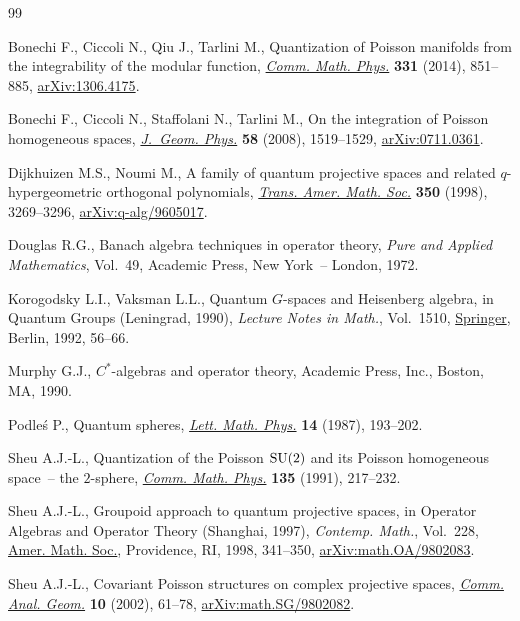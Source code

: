 \documentclass[pdftex]{sigma}
\begin{document}
\begin{thebibliography}{99}
\footnotesize\itemsep=0pt

Bonechi F., Ciccoli N., Qiu J., Tarlini M., Quantization of {P}oisson manifolds
 from the integrability of the modular function, \href{https://doi.org/10.1007/s00220-014-2050-9}{\textit{Comm. Math. Phys.}}
 \textbf{331} (2014), 851--885, \href{https://arxiv.org/abs/1306.4175}{arXiv:1306.4175}.

Bonechi F., Ciccoli N., Staffolani N., Tarlini M., On the integration of
 {P}oisson homogeneous spaces, \href{https://doi.org/10.1016/j.geomphys.2008.07.001}{\textit{J.~Geom. Phys.}} \textbf{58} (2008),
 1519--1529, \href{https://arxiv.org/abs/0711.0361}{arXiv:0711.0361}.

Dijkhuizen M.S., Noumi M., A family of quantum projective spaces and related
 {$q$}-hypergeometric orthogonal polynomials, \href{https://doi.org/10.1090/S0002-9947-98-01971-0}{\textit{Trans. Amer. Math. Soc.}}
 \textbf{350} (1998), 3269--3296, \href{https://arxiv.org/abs/q-alg/9605017}{arXiv:q-alg/9605017}.

Douglas R.G., Banach algebra techniques in operator theory, \textit{Pure and
 Applied Mathematics}, Vol.~49, Academic Press, New York~-- London, 1972.

Korogodsky L.I., Vaksman L.L., Quantum {$G$}-spaces and {H}eisenberg algebra,
 in Quantum Groups ({L}eningrad, 1990), \textit{Lecture Notes in Math.}, Vol.~1510, \href{https://doi.org/10.1007/BFb0101178}{Springer}, Berlin, 1992, 56--66.

Murphy G.J., {$C^*$}-algebras and operator theory, Academic Press, Inc.,
 Boston, MA, 1990.

Podle\'s P., Quantum spheres, \href{https://doi.org/10.1007/BF00416848}{\textit{Lett. Math. Phys.}} \textbf{14} (1987),
 193--202.

Sheu A.J.-L., Quantization of the {P}oisson {${\rm SU}(2)$} and its {P}oisson
 homogeneous space~-- the {$2$}-sphere, \href{https://doi.org/10.1007/BF02098041}{\textit{Comm. Math. Phys.}}
 \textbf{135} (1991), 217--232.

Sheu A.J.-L., Groupoid approach to quantum projective spaces, in Operator
 Algebras and Operator Theo\-ry ({S}hanghai, 1997), \textit{Contemp. Math.},
 Vol.~228, \href{https://doi.org/10.1090/conm/228/03296}{Amer. Math. Soc.}, Providence, RI, 1998, 341--350,
 \href{https://arxiv.org/abs/math.OA/9802083}{arXiv:math.OA/9802083}.

Sheu A.J.-L., Covariant {P}oisson structures on complex projective spaces,
 \href{https://doi.org/10.4310/CAG.2002.v10.n1.a4}{\textit{Comm. Anal. Geom.}} \textbf{10} (2002), 61--78,
 \href{https://arxiv.org/abs/math.SG/9802082}{arXiv:math.SG/9802082}.

\end{thebibliography}\LastPageEnding
\end{document}
